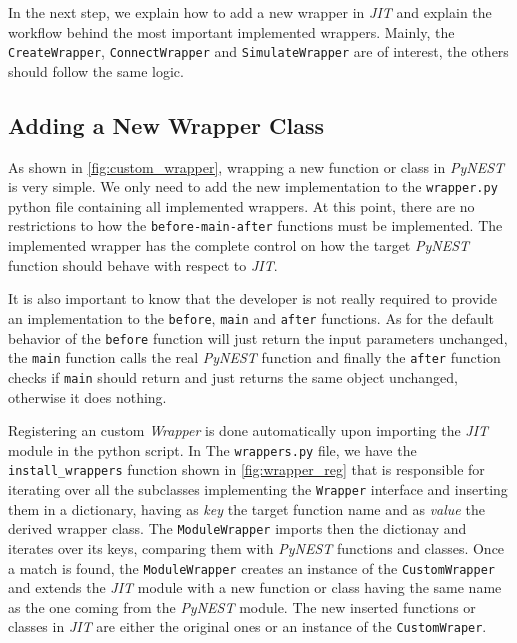    In the next step, we explain how to add a new wrapper in \emph{JIT} and explain the workflow behind the most important implemented wrappers. Mainly, the \texttt{CreateWrapper}, \texttt{ConnectWrapper} and \texttt{SimulateWrapper} are of interest, the others should follow the same logic.
   
   
\subsection{Adding a New Wrapper Class}

As shown in \autoref{fig:custom_wrapper}, wrapping a new function or class in \emph{PyNEST} is very simple. We only need to add the new implementation to the \texttt{wrapper.py} python file containing all implemented wrappers. At this point, there are no restrictions to how the \texttt{before-main-after} functions must be implemented. The implemented wrapper has the complete  control on how the target \emph{PyNEST} function should behave with respect to \emph{JIT}.


It is also important to know that the developer is not really required to provide an  implementation to the \texttt{before}, \texttt{main} and \texttt{after} functions. As for the default behavior of the \texttt{before} function will just return the input parameters unchanged, the \texttt{main} function calls the real \emph{PyNEST} function and finally the \texttt{after} function checks if \texttt{main} should return and just returns the same object unchanged, otherwise it does nothing.

Registering an custom \emph{Wrapper} is done automatically upon importing the \emph{JIT} module in the python script. In The \texttt{wrappers.py} file, we have the \texttt{install\_wrappers} function shown in \autoref{fig:wrapper_reg} that is responsible for iterating over all the subclasses implementing the \texttt{Wrapper} interface and inserting them in a dictionary, having as \emph{key} the target function name and as \emph{value} the derived wrapper class. The \texttt{ModuleWrapper} imports then the dictionay and iterates over its keys, comparing them with \emph{PyNEST} functions and classes. Once a match is found, the \texttt{ModuleWrapper} creates an instance of the \texttt{CustomWrapper} and extends the \emph{JIT} module with a new function or class having the same name as the one coming from the \emph{PyNEST} module. The new inserted functions or classes in \emph{JIT} are either the original ones or an instance of the \texttt{CustomWraper}.

